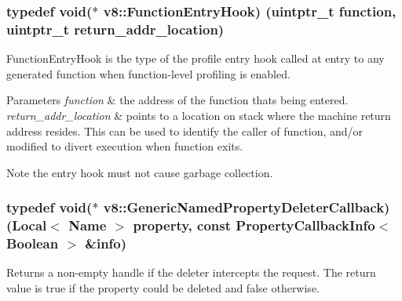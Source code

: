 \subsubsection[{\texorpdfstring{Function\+Entry\+Hook}{FunctionEntryHook}}]{\setlength{\rightskip}{0pt plus 5cm}typedef void($\ast$ v8\+::\+Function\+Entry\+Hook) (uintptr\+\_\+t function, uintptr\+\_\+t return\+\_\+addr\+\_\+location)}\hypertarget{namespacev8_aaf07fb6bb13f295da3c6568938b7dec5}{}\label{namespacev8_aaf07fb6bb13f295da3c6568938b7dec5}
Function\+Entry\+Hook is the type of the profile entry hook called at entry to any generated function when function-\/level profiling is enabled.


\begin{DoxyParams}{Parameters}
{\em function} & the address of the function that\textquotesingle{}s being entered. \\
\hline
{\em return\+\_\+addr\+\_\+location} & points to a location on stack where the machine return address resides. This can be used to identify the caller of {\ttfamily function}, and/or modified to divert execution when {\ttfamily function} exits.\\
\hline
\end{DoxyParams}
\begin{DoxyNote}{Note}
the entry hook must not cause garbage collection. 
\end{DoxyNote}
\subsubsection[{\texorpdfstring{Generic\+Named\+Property\+Deleter\+Callback}{GenericNamedPropertyDeleterCallback}}]{\setlength{\rightskip}{0pt plus 5cm}typedef void($\ast$ v8\+::\+Generic\+Named\+Property\+Deleter\+Callback) ({\bf Local}$<$ {\bf Name} $>$ property, const {\bf Property\+Callback\+Info}$<$ {\bf Boolean} $>$ \&info)}\hypertarget{namespacev8_ad2aecc0406ea4bc02d5a4f84a433b273}{}\label{namespacev8_ad2aecc0406ea4bc02d5a4f84a433b273}
Returns a non-\/empty handle if the deleter intercepts the request. The return value is true if the property could be deleted and false otherwise. 
